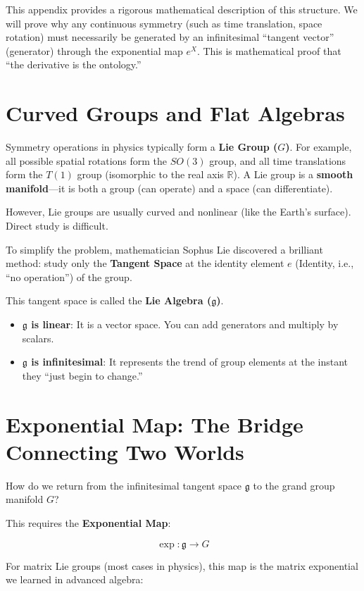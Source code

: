 \documentclass[11pt,a4paper,twoside]{book}
\begin{document}
This appendix provides a rigorous mathematical description of this structure. We will prove why any continuous symmetry (such as time translation, space rotation) must necessarily be generated by an infinitesimal ``tangent vector'' (generator) through the exponential map $e^X$. This is mathematical proof that ``the derivative is the ontology.''

\section{Curved Groups and Flat Algebras}

Symmetry operations in physics typically form a \textbf{Lie Group ($G$)}. For example, all possible spatial rotations form the $SO(3)$ group, and all time translations form the $T(1)$ group (isomorphic to the real axis $\mathbb{R}$). A Lie group is a \textbf{smooth manifold}---it is both a group (can operate) and a space (can differentiate).

However, Lie groups are usually curved and nonlinear (like the Earth's surface). Direct study is difficult.

To simplify the problem, mathematician Sophus Lie discovered a brilliant method: study only the \textbf{Tangent Space} at the identity element $e$ (Identity, i.e., ``no operation'') of the group.

This tangent space is called the \textbf{Lie Algebra ($\mathfrak{g}$)}.

\begin{itemize}
\item \textbf{$\mathfrak{g}$ is linear}: It is a vector space. You can add generators and multiply by scalars.

\item \textbf{$\mathfrak{g}$ is infinitesimal}: It represents the trend of group elements at the instant they ``just begin to change.''
\end{itemize}

\section{Exponential Map: The Bridge Connecting Two Worlds}

How do we return from the infinitesimal tangent space $\mathfrak{g}$ to the grand group manifold $G$?

This requires the \textbf{Exponential Map}:

$$\exp: \mathfrak{g} \to G$$

For matrix Lie groups (most cases in physics), this map is the matrix exponential we learned in advanced algebra:
\end{document}
